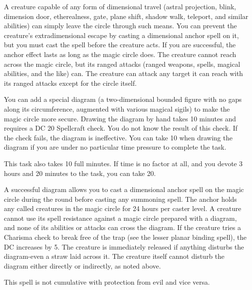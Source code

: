 {A creature capable of any form of dimensional travel (astral projection, blink, dimension door, etherealness, gate, plane shift, shadow walk, teleport, and similar abilities) can simply leave the circle through such means. You can prevent the creature's extradimensional escape by casting a dimensional anchor spell on it, but you must cast the spell before the creature acts. If you are successful, the anchor effect lasts as long as the magic circle does. The creature cannot reach across the magic circle, but its ranged attacks (ranged weapons, spells, magical abilities, and the like) can. The creature can attack any target it can reach with its ranged attacks except for the circle itself.

You can add a special diagram (a two-dimensional bounded figure with no gaps along its circumference, augmented with various magical sigils) to make the magic circle more secure. Drawing the diagram by hand takes 10 minutes and requires a DC 20 Spellcraft check. You do not know the result of this check. If the check fails, the diagram is ineffective. You can take 10 when drawing the diagram if you are under no particular time pressure to complete the task.

This task also takes 10 full minutes. If time is no factor at all, and you devote 3 hours and 20 minutes to the task, you can take 20.

A successful diagram allows you to cast a dimensional anchor spell on the magic circle during the round before casting any summoning spell. The anchor holds any called creatures in the magic circle for 24 hours per caster level. A creature cannot use its spell resistance against a magic circle prepared with a diagram, and none of its abilities or attacks can cross the diagram. If the creature tries a Charisma check to break free of the trap (see the lesser planar binding spell), the DC increases by 5. The creature is immediately released if anything disturbs the diagram-even a straw laid across it. The creature itself cannot disturb the diagram either directly or indirectly, as noted above.

This spell is not cumulative with protection from evil and vice versa.}
        
